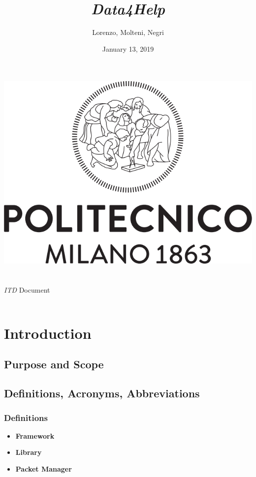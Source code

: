 \documentclass[titlepage]{article}
\title{{\Huge {\it Data4Help}}}
\author{Lorenzo, Molteni, Negri}
\date{January 13, 2019}
\begin{document}
\makeatletter
    \begin{titlepage}
        \begin{center}
            \includegraphics[width=\linewidth]{logo.png}\\[20ex]
            {\huge  \@title }\\[2ex] 
            {\LARGE  \@author}\\[3ex] 
            {\LARGE {\it ITD} Document}\\[3ex]
            {\large \@date}\\[5ex]
        \end{center}
    \end{titlepage}
\makeatother
\thispagestyle{empty}
\newpage

\thispagestyle{empty}
\newpage


	
\pagebreak
\tableofcontents{}
\pagebreak


\section{Introduction}
\subsection{Purpose and Scope}
\subsection{Definitions, Acronyms, Abbreviations}
\subsubsection{Definitions}
\begin{itemize}
	\item {\bf Framework}
	\item {\bf Library}
	\item {\bf Packet Manager}
\end{itemize}
\end{document}
